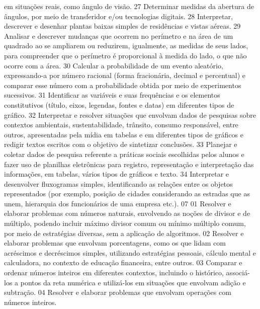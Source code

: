 {{{				em situações reais, como ângulo de visão.
			}
			{27}{%
				Determinar medidas da abertura de ângulos, por meio de transferidor e/ou
				tecnologias digitais.
			}
			{28}{%
				Interpretar, descrever e desenhar plantas baixas simples de residências e vistas aéreas.
			}
			{29}{%
				Analisar e descrever mudanças que ocorrem no perímetro e na área de um
				quadrado ao se ampliarem ou reduzirem, igualmente, as medidas de seus lados, para
				compreender que o perímetro é proporcional à medida do lado, o que não ocorre com a área.
			}
			{30}{%
				Calcular a probabilidade de um evento aleatório, expressando-a por número
				racional (forma fracionária, decimal e percentual) e comparar esse número com a probabilidade
				obtida por meio de experimentos sucessivos.
			}
			{31}{%
				Identificar as variáveis e suas frequências e os elementos constitutivos (título, eixos,
				legendas, fontes e datas) em diferentes tipos de gráfico.
			}
			{32}{%
				Interpretar e resolver situações que envolvam dados de pesquisas sobre contextos
				ambientais, sustentabilidade, trânsito, consumo responsável, entre outros, apresentadas pela
				mídia em tabelas e em diferentes tipos de gráficos e redigir textos escritos com o objetivo de
				sintetizar conclusões.
			}
			{33}{%
				Planejar e coletar dados de pesquisa referente a práticas sociais escolhidas pelos
				alunos e fazer uso de planilhas eletrônicas para registro, representação e interpretação das
				informações, em tabelas, vários tipos de gráficos e texto.
			}
			{34}{%
				Interpretar e desenvolver fluxogramas simples, identificando as relações entre
				os objetos representados (por exemplo, posição de cidades considerando as estradas que as
				unem, hierarquia dos funcionários de uma empresa etc.).
      }
	}
	{07}{%
		{01}{%
				Resolver e elaborar problemas com números naturais, envolvendo as noções de
				divisor e de múltiplo, podendo incluir máximo divisor comum ou mínimo múltiplo comum, por
				meio de estratégias diversas, sem a aplicação de algoritmos.
			}
			{02}{%
				Resolver e elaborar problemas que envolvam porcentagens, como os que lidam
				com acréscimos e decréscimos simples, utilizando estratégias pessoais, cálculo mental e
				calculadora, no contexto de educação financeira, entre outros.
			}
			{03}{%
				Comparar e ordenar números inteiros em diferentes contextos, incluindo o
				histórico, associá-los a pontos da reta numérica e utilizá-los em situações que envolvam adição
				e subtração.
			}
			{04}{%
				Resolver e elaborar problemas que envolvam operações com números inteiros.
}}}
